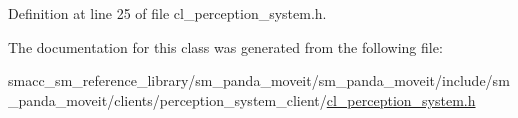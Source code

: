 Definition at line 25 of file cl\+\_\+perception\+\_\+system.\+h.



The documentation for this class was generated from the following file\+:\begin{DoxyCompactItemize}
\item 
smacc\+\_\+sm\+\_\+reference\+\_\+library/sm\+\_\+panda\+\_\+moveit/sm\+\_\+panda\+\_\+moveit/include/sm\+\_\+panda\+\_\+moveit/clients/perception\+\_\+system\+\_\+client/\hyperlink{sm__panda__moveit_2sm__panda__moveit_2include_2sm__panda__moveit_2clients_2perception__system__cc1c9530385af1e47b0b506464d2e9fea}{cl\+\_\+perception\+\_\+system.\+h}\end{DoxyCompactItemize}

